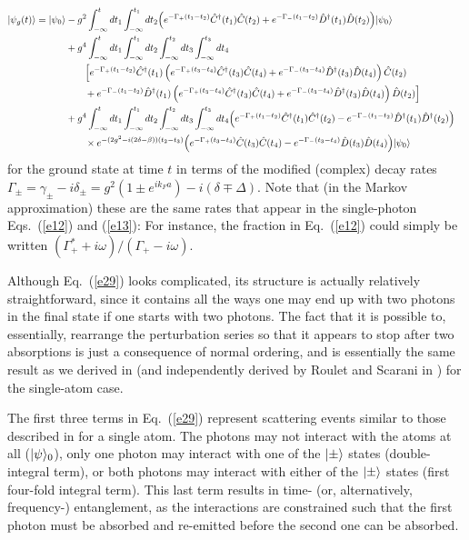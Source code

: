 \documentclass[aps,pra,twocolumn,floatfix,superscriptaddress]{revtex4}
\begin{document}
\begin{widetext}
\begin{align}
|\psi_{g}(t)\rangle=|\psi_0\rangle &-g^2 \int^{t}_{-\infty} dt_1\int^{t_1}_{-\infty} dt_2 \Big(e^{-\Gamma_{+}(t_1-t_2)} \hat C^{\dagger}(t_1) \hat C(t_2) + e^{-\Gamma_{-}(t_1-t_2)} \hat D^{\dagger}(t_1) \hat D(t_2)\Big) |\psi_0\rangle\cr
 &+ g^4 \int_{-\infty}^{t}dt_1 \int_{-\infty}^{t_1}dt_2 \int_{-\infty}^{t_2}dt_3 \int_{-\infty}^{t_3}dt_4 \cr
 &\qquad\Big[e^{-\Gamma_{+}(t_1-t_2)} \hat C^{\dagger}(t_1) \left(e^{-\Gamma_{+}(t_3-t_4)} \hat C^\dagger(t_3)    \hat C(t_4) + e^{-\Gamma_{-}(t_3-t_4)}  \hat D^{\dagger}(t_3) \hat D(t_4)\right)\hat C(t_2)\cr
   &\qquad + e^{-\Gamma_{-}(t_1-t_2)} \hat D^{\dagger}(t_1) \left(e^{-\Gamma_{+}(t_3-t_4)}   \hat C^{\dagger}(t_3)  \hat C(t_4) + e^{-\Gamma_{-}(t_3-t_4)} \hat D^\dagger(t_3) \hat D(t_4)\right) \hat D(t_2) \Bigr]\cr
   &+ g^4 \int_{-\infty}^{t}dt_1 \int_{-\infty}^{t_1}dt_2 \int_{-\infty}^{t_2}dt_3 \int_{-\infty}^{t_3}dt_4\Big(e^{-\Gamma_{+}(t_1-t_2) } \hat C^{\dagger}(t_1) \hat C^{\dagger }(t_2)-e^{-\Gamma_{-}(t_1-t_2)}\hat D^{\dagger}(t_1) \hat D^{ \dagger}(t_2)\Big)\cr
   &\qquad\times e^{-(2g^2-i( 2\delta-\beta ))(t_2-t_3)} \Big(e^{-\Gamma_{+}(t_3-t_4) } \hat C(t_3) \hat C(t_4)-e^{-\Gamma_{-}(t_3-t_4)}\hat D(t_3) \hat D(t_4) \Big)|\psi_0\rangle
   \label{e29}
\end{align}
for the ground state at time $t$ in terms of the modified (complex) decay rates $\Gamma_\pm = \gamma_\pm-i\delta_\pm = g^2(1\pm e^{ik_Fa})-i(\delta\mp\Delta)$.  Note that (in the Markov approximation) these are the same rates that appear in the single-photon Eqs.~(\ref{e12}) and (\ref{e13}):  For instance, the fraction in Eq.~(\ref{e12}) could simply be written $(\Gamma_+^\ast +i\omega)/(\Gamma_+-i\omega)$.
\end{widetext}
Although Eq.~(\ref{e29}) looks complicated, its structure is actually relatively straightforward, since it contains all the ways one may end up with two photons in the final state if one starts with two photons.  The fact that it is possible to, essentially, rearrange the perturbation series so that it appears to stop after two absorptions is just a consequence of normal ordering, and is essentially the same result as we derived in \cite{us} (and independently derived by Roulet and Scarani in \cite{roulet}) for the single-atom case.  

The first three terms in Eq.~(\ref{e29}) represent scattering events similar to those described in \cite{us} for a single atom. The photons may not interact with the atoms at all ($|\psi\rangle_0$), only one photon may interact with one of the $|\pm\rangle$ states (double-integral term), or both photons may interact with either of the $|\pm\rangle$ states (first four-fold integral term).  This last term results in time- (or, alternatively, frequency-) entanglement, as the interactions are constrained such that the first photon must be absorbed and re-emitted before the second one can be absorbed.
\end{document}

